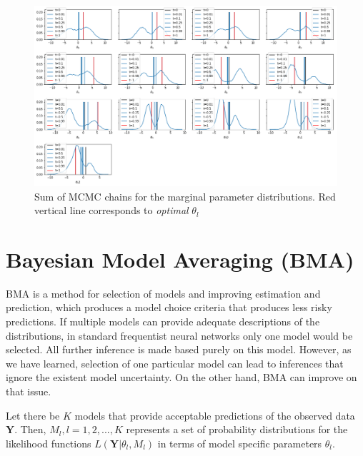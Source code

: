 \documentclass[review]{siamart190516}
\begin{document}
\begin{figure}[h!]
    \centering
    \includegraphics[width = \linewidth]{Images/mcmc_tot_circle.png}
    \caption{Sum of MCMC chains for the marginal  parameter distributions. Red vertical line corresponds to \textit{optimal} $\theta_l$}
    \label{fig:mcmc_tot}
\end{figure}

\section{Bayesian Model Averaging (BMA)}
BMA is a method for selection of models and improving estimation and prediction, which produces a model choice criteria that produces less risky predictions. If multiple models can provide adequate descriptions of the distributions, in standard frequentist neural networks only one model would be selected. All further inference is made based purely on this model. However, as we have learned, selection of one particular model can lead to inferences that ignore the existent model uncertainty. On the other hand, BMA can improve on that issue.
   
Let there be $K$ models that provide acceptable predictions of the observed data $\mathbf{Y}$. Then, $M_l, l = 1,2,...,K$ represents a set of probability distributions for the likelihood functions $L(\mathbf{Y}|\theta_l,M_l)$ in terms of model specific parameters $\theta_l$. 
\end{document}
